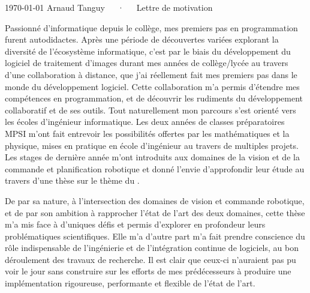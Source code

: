 \documentclass[11pt, a4paper]{awesome-cv}
\begin{document}
\makecvheader[R]

\makecvfooter
  {\today}
  {Arnaud Tanguy~~~·~~~Lettre de motivation}
  {}

\makelettertitle

\begin{cvletter}

Passionné d'informatique depuis le collège, mes premiers pas en programmation furent autodidactes. Après une période de découvertes variées explorant la diversité de l'écosystème informatique, c'est par le biais du développement du logiciel  de traitement d'images  durant mes années de collège/lycée au travers d'une collaboration à distance, que j'ai réellement fait mes premiers pas dans le monde du développement logiciel. Cette collaboration m'a permis d'étendre mes compétences en programmation, et de découvrir les rudiments du développement collaboratif et de ses outils. Tout naturellement mon parcours s'est orienté vers les écoles d'ingénieur informatique. Les deux années de classes préparatoires MPSI m'ont fait entrevoir les possibilités offertes par les mathématiques et la physique, mises en pratique en école d'ingénieur au travers de multiples projets. Les stages de dernière année m'ont introduits aux domaines de la vision et de la commande et planification robotique et donné l'envie d'approfondir leur étude au travers d'une thèse sur le thème du .

De par sa nature, à l'intersection des domaines de vision et commande robotique, et de par son ambition à rapprocher l'état de l'art des deux domaines, cette thèse m'a mis face à d'uniques défis et permis d'explorer en profondeur leurs problématiques scientifiques. Elle m'a d'autre part m'a fait prendre conscience du rôle indispensable de l'ingénierie et de l'intégration continue de logiciels, au bon déroulement des travaux de recherche. Il est clair que ceux-ci n'auraient pas pu voir le jour sans construire sur les efforts de mes prédécesseurs à produire une implémentation rigoureuse, performante et flexible de l'état de l'art.


\end{cvletter}
\end{document}
